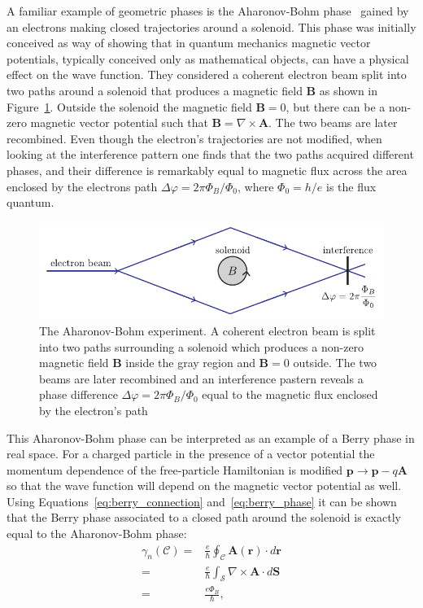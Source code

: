 A familiar example of geometric phases is the Aharonov-Bohm phase~\cite{aharonov_significance_1959} gained by an electrons making closed trajectories around a solenoid. This phase was initially conceived as way of showing that in quantum mechanics magnetic vector potentials, typically conceived only as mathematical objects, can have a physical effect on the wave function. They considered a coherent electron beam split into two paths around a solenoid that produces a magnetic field $\mathbf{B}$ as shown in Figure~\ref{fig:aharonov_bohm}. Outside the solenoid the magnetic field $\mathbf{B}=0$, but there can be a non-zero magnetic vector potential such that $\mathbf{B}=\nabla\times\mathbf{A}$. The two beams are later recombined. Even though the electron's trajectories are not modified, when looking at the interference pattern one finds that the two paths acquired different phases, and their difference is remarkably equal to magnetic flux across the area enclosed by the electrons path $\Delta\varphi = 2\pi \Phi_B/\Phi_0$, where $\Phi_0=h/e$ is the flux quantum. 

\begin{figure}[htb]
\begin{center}
\includegraphics[]{Figures/Chapter7/aharonov_bohm.pdf}
\caption[The Aharonov-Bohm experiment]{The Aharonov-Bohm experiment. A coherent electron beam is split into two paths surrounding a solenoid which produces a non-zero magnetic field $\mathbf{B}$ inside the gray region and $\mathbf{B}=0$ outside. The two beams are later recombined and an interference pastern reveals a phase difference $\Delta\varphi = 2\pi \Phi_B/\Phi_0$ equal to the magnetic flux enclosed by the electron's path}
\label{fig:aharonov_bohm}
\end{center}
\end{figure}

This Aharonov-Bohm phase can be interpreted as an example of a Berry phase in real space. For a charged particle in the presence of a vector potential the momentum dependence of the free-particle Hamiltonian is modified $\mathbf{p}\rightarrow\mathbf{p}-q\mathbf{A}$ so that the wave function will depend on the magnetic vector potential as well. Using Equations~\ref{eq:berry_connection} and~\ref{eq:berry_phase} it can be shown that the Berry phase associated to a closed path around the solenoid is exactly equal to the Aharonov-Bohm phase: 
%
\begin{align}
	\gamma_n(\mathcal{C})=&\frac{e}{\hbar}\oint_{\mathcal{C}}\mathbf{A}(\mathbf{r})\cdot d\mathbf{r} \nonumber \\
	=& \frac{e}{\hbar}\int_{\mathcal{S}}\nabla\times\mathbf{A}\cdot d\mathbf{S} \nonumber \\
	=& \frac{e\Phi_B}{\hbar},
	\label{eq:aharonov_bohm_phase}
\end{align}

